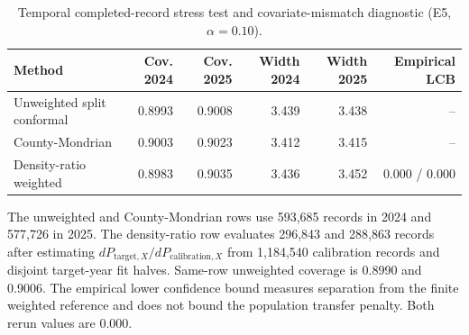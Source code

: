 \begin{table}[pos=htbp]
\caption{Temporal completed-record stress test and covariate-mismatch diagnostic (E5, $\alpha=0.10$).}
\label{tbl:temporal}
\centering\footnotesize
\begin{threeparttable}
\begin{tabular*}{\tblwidth}{@{\extracolsep{\fill}}lrrrrr@{}}
\toprule
Method & Cov. 2024 & Cov. 2025 & Width 2024 & Width 2025 & Empirical LCB \\
\midrule
Unweighted split conformal & 0.8993 & 0.9008 & 3.439 & 3.438 & -- \\
County-Mondrian & 0.9003 & 0.9023 & 3.412 & 3.415 & -- \\
Density-ratio weighted & 0.8983 & 0.9035 & 3.436 & 3.452 & 0.000 / 0.000 \\
\bottomrule
\end{tabular*}
\begin{tablenotes}\footnotesize
\item The unweighted and County-Mondrian rows use 593,685 records in 2024 and 577,726 in 2025. The density-ratio row evaluates 296,843 and 288,863 records after estimating $dP_{\mathrm{target},X}/dP_{\mathrm{calibration},X}$ from 1,184,540 calibration records and disjoint target-year fit halves. Same-row unweighted coverage is 0.8990 and 0.9006. The empirical lower confidence bound measures separation from the finite weighted reference and does not bound the population transfer penalty. Both rerun values are 0.000.
\end{tablenotes}
\end{threeparttable}
\end{table}

